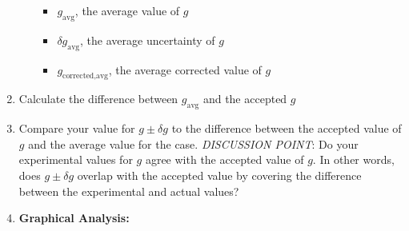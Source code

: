 \begin{enumerate}
\begin{itemize}
\begin{itemize}
      \item $g_{\text{avg}}$, the average value of $g$
      \item $\delta g_{\text{avg}}$, the average uncertainty of $g$
      \item $g_\text{corrected,avg}$, the average corrected value of $g$
  \end{itemize}
  \end{itemize}
  \item Calculate the difference between $g_{\text{avg}}$ and the accepted $g$
\item Compare your value for $g \pm \delta g$ to the difference between the accepted value of $g$ and the average value for the case. \textit{DISCUSSION POINT}: Do your experimental values for $g$ agree with the accepted value of $g$. In other words, does $g \pm \delta g$ overlap with the accepted value by covering the difference between the experimental and actual values?





\item{\textbf{Graphical Analysis:}}


\end{enumerate}
